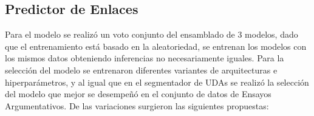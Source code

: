 \begin{table}[h!]
	\begin{center}
	\caption{Métricas de las pruebas del segmentador de UDA.}\label{table:test_metrics_segmenter}
	\end{center}
\end{table}
\begin{table}[h!]
	\begin{center}
	\caption{Métricas BIOES de las pruebas del segmentador de UDA.}\label{table:test_bioes_metrics_segmenter}
	\end{center}
\end{table}

\subsection{Predictor de Enlaces}

Para el modelo se realizó un voto conjunto del ensamblado de 3 modelos, dado que el entrenamiento 
está basado en la aleatoriedad, se entrenan los modelos con los mismos datos obteniendo inferencias no
necesariamente iguales.
Para la selección del modelo se entrenaron diferentes variantes de arquitecturas e hiperparámetros, y 
al igual que en el segmentador de UDAs se realizó la selección del modelo que mejor se desempeñó en 
el conjunto de datos de Ensayos Argumentativos. De las variaciones surgieron las siguientes propuestas:

